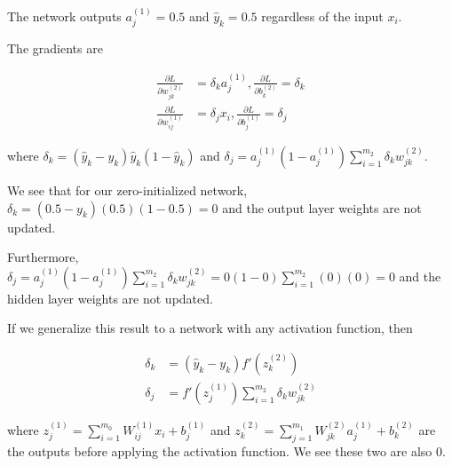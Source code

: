 \documentclass{scrbook}
\begin{document}
The network outputs ${a}_{j}^{\left(1\right)}=0.5$ and $\hat{y}_{k}=0.5$ regardless of the input $x_{i}$.

The gradients are

\begin{align*}
\frac{\partial L}{\partial {w}_{jk}^{\left(2\right)}}&=\delta _{k}{a}_{j}^{\left(1\right)},\frac{\partial L}{\partial {b}_{k}^{\left(2\right)}}=\delta _{k} \\
\frac{\partial L}{\partial {w}_{ij}^{\left(1\right)}}&=\delta _{j}x_{i},\frac{\partial L}{\partial {b}_{j}^{\left(1\right)}}=\delta _{j} 
\end{align*}

where $\delta _{k}=\left(\hat{y}_{k}-y_{k}\right)\hat{y}_{k}\left(1-\hat{y}_{k}\right)$ and $\delta _{j}={a}_{j}^{\left(1\right)}\left(1-{a}_{j}^{\left(1\right)}\right){\sum }_{i=1}^{m_{2}}\delta _{k}{w}_{jk}^{\left(2\right)}$.

We see that for our zero-initialized network, $\delta _{k}=\left(0.5-y_{k}\right)\left(0.5\right)\left(1-0.5\right)=0$ and the output layer weights are not updated.

Furthermore, $\delta _{j}={a}_{j}^{\left(1\right)}\left(1-{a}_{j}^{\left(1\right)}\right){\sum }_{i=1}^{m_{2}}\delta _{k}{w}_{jk}^{\left(2\right)}=0\left(1-0\right){\sum }_{i=1}^{m_{2}}\left(0\right)\left(0\right)=0$ and the hidden layer weights are not updated.

If we generalize this result to a network with any activation function, then

\begin{align*}
\delta _{k}&=\left(\hat{y}_{k}-y_{k}\right)f'\left({z}_{k}^{\left(2\right)}\right) \\
\delta _{j}&=f'\left({z}_{j}^{\left(1\right)}\right){\sum }_{i=1}^{m_{2}}\delta _{k}{w}_{jk}^{\left(2\right)} 
\end{align*}

where ${z}_{j}^{\left(1\right)}={\sum }_{i=1}^{m_{0}}{W}_{ij}^{\left(1\right)}x_{i}+{b}_{j}^{\left(1\right)}$ and ${z}_{k}^{\left(2\right)}={\sum }_{j=1}^{m_{1}}{W}_{jk}^{\left(2\right)}{a}_{j}^{\left(1\right)}+{b}_{k}^{\left(2\right)}$ are the outputs before applying the activation function. We see these two are also 0.
\end{document}
